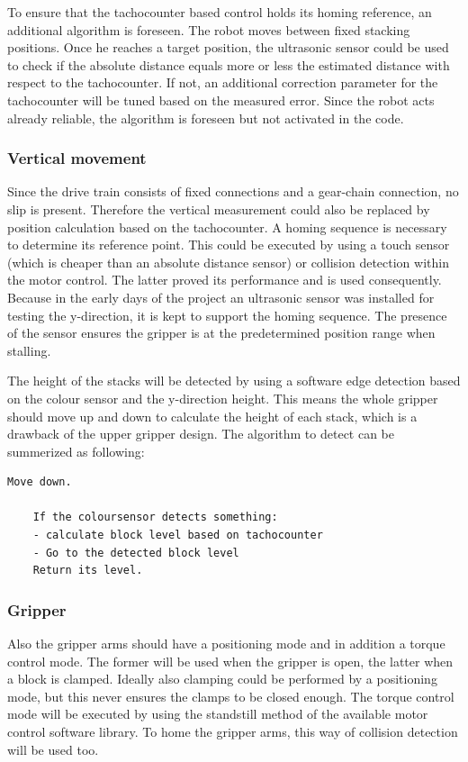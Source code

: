 \documentclass{article}
\begin{document}
	\par To ensure that the tachocounter based control holds its homing reference, an additional algorithm is foreseen. The robot moves between fixed stacking positions. Once he reaches a target position, the ultrasonic sensor could be used to check if the absolute distance equals more or less the estimated distance with respect to the tachocounter. If not, an additional correction parameter for the tachocounter will be tuned based on the measured error. Since the robot acts already reliable, the algorithm is foreseen but not activated in the code.
	
	\subsubsection{Vertical movement}
	\par Since the drive train consists of fixed connections and a gear-chain connection, no slip is present. Therefore the vertical measurement could also be replaced by position calculation based on the tachocounter. A homing sequence is necessary to determine its reference point. This could be executed by using a touch sensor (which is cheaper than an absolute distance sensor) or collision detection within the motor control. The latter proved its performance and is used consequently. Because in the early days of the project an ultrasonic sensor was installed for testing the y-direction, it is kept to support the homing sequence. The presence of the sensor ensures the gripper is at the predetermined position range when stalling.
	
	\par The height of the stacks will be detected by using a software edge detection based on the colour sensor and the y-direction height. This means the whole gripper should move up and down to calculate the height of each stack, which is a drawback of the upper gripper design. The algorithm to detect can be summerized as following:
	\begin{Verbatim}[fontsize=\small]
	Move down.
	
	If the coloursensor detects something:
	- calculate block level based on tachocounter
	- Go to the detected block level
	Return its level.
	\end{Verbatim}
	
	\subsubsection{Gripper}
	\par Also the gripper arms should have a positioning mode and in addition a torque control mode. The former will be used when the gripper is open, the latter when a block is clamped. Ideally also clamping could be performed by a positioning mode, but this never ensures the clamps to be closed enough. The torque control mode will be executed by using the standstill method of the available motor control software library. To home the gripper arms, this way of collision detection will be used too.
	
\end{document}
